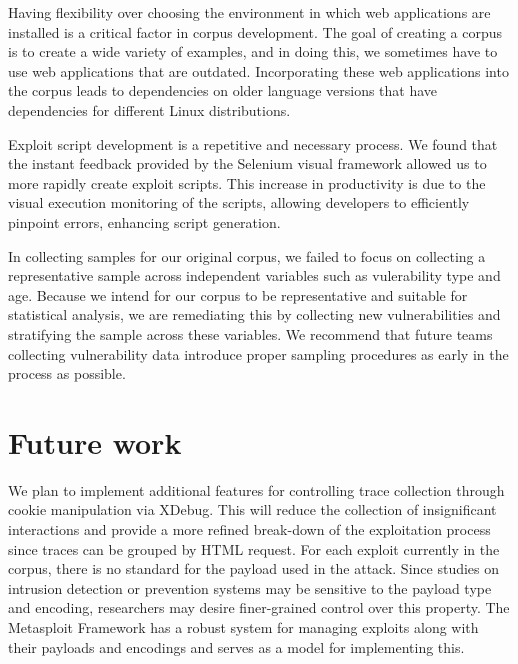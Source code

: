 \documentclass[letterpaper,twocolumn,10pt]{article}
\begin{document}
Having flexibility over choosing the environment in which web applications are installed is a critical factor in corpus development.  The goal of creating a corpus is to create a wide variety of examples, and in doing this, we sometimes have to use web applications that are outdated.  Incorporating these web applications into the corpus leads to dependencies on older language versions that have dependencies for different Linux distributions.\par

Exploit script development is a repetitive and necessary process. We found that the instant feedback provided by the Selenium visual framework allowed us to more rapidly create exploit scripts.  This increase in productivity is due to the visual execution monitoring of the scripts, allowing developers to efficiently pinpoint errors, enhancing script generation.  \par

In collecting samples for our original corpus, we failed to focus on collecting a representative sample across independent variables such as vulerability type and age. Because we intend for our corpus to be representative and suitable for statistical analysis, we are remediating this by collecting new vulnerabilities and stratifying the sample across these variables. We recommend that future teams collecting vulnerability data introduce proper sampling procedures as early in the process as possible.\par

\section{Future work}
We plan to implement additional features for controlling trace collection through cookie manipulation via XDebug. This will reduce the collection of insignificant interactions and provide a more refined break-down of the exploitation process since traces can be grouped by HTML request. For each exploit currently in the corpus, there is no standard for the payload used in the attack. Since studies on intrusion detection or prevention systems may be sensitive to the payload type and encoding, researchers may desire finer-grained control over this property. The Metasploit Framework has a  robust system for managing exploits along with their payloads and encodings and serves as a model for implementing this.
\end{document}
